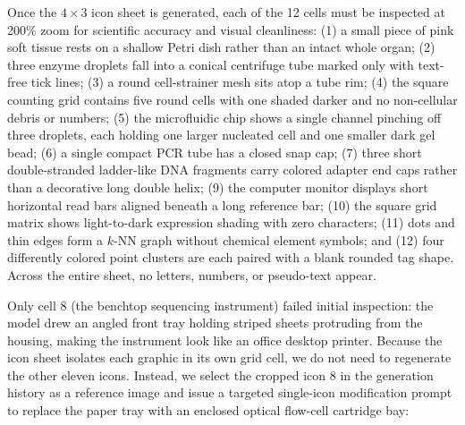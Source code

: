 Once the $4 \times 3$ icon sheet is generated, each of the 12 cells must be inspected at 200\% zoom for scientific accuracy and visual cleanliness: (1) a small piece of pink soft tissue rests on a shallow Petri dish rather than an intact whole organ; (2) three enzyme droplets fall into a conical centrifuge tube marked only with text-free tick lines; (3) a round cell-strainer mesh sits atop a tube rim; (4) the square counting grid contains five round cells with one shaded darker and no non-cellular debris or numbers; (5) the microfluidic chip shows a single channel pinching off three droplets, each holding one larger nucleated cell and one smaller dark gel bead; (6) a single compact PCR tube has a closed snap cap; (7) three short double-stranded ladder-like DNA fragments carry colored adapter end caps rather than a decorative long double helix; (9) the computer monitor displays short horizontal read bars aligned beneath a long reference bar; (10) the square grid matrix shows light-to-dark expression shading with zero characters; (11) dots and thin edges form a $k$-NN graph without chemical element symbols; and (12) four differently colored point clusters are each paired with a blank rounded tag shape. Across the entire sheet, no letters, numbers, or pseudo-text appear.

Only cell 8 (the benchtop sequencing instrument) failed initial inspection: the model drew an angled front tray holding striped sheets protruding from the housing, making the instrument look like an office desktop printer. Because the icon sheet isolates each graphic in its own grid cell, we do not need to regenerate the other eleven icons. Instead, we select the cropped icon 8 in the \scidraw{} generation history as a reference image and issue a targeted single-icon modification prompt to replace the paper tray with an enclosed optical flow-cell cartridge bay:


